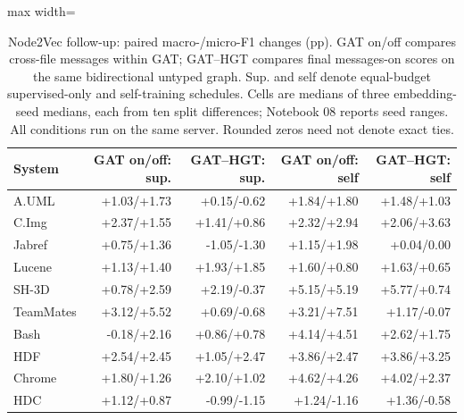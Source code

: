 \begin{table}[t]
\centering\small
\caption{Node2Vec follow-up: paired macro-/micro-F1 changes (pp). GAT on/off compares cross-file messages within GAT; GAT--HGT compares final messages-on scores on the same bidirectional untyped graph. Sup. and self denote equal-budget supervised-only and self-training schedules. Cells are medians of three embedding-seed medians, each from ten split differences; Notebook 08 reports seed ranges. All conditions run on the same server. Rounded zeros need not denote exact ties.\label{tab:gat_controls}}
\begin{adjustbox}{max width=\textwidth}
\begin{tabular}{lrrrr}
\toprule
System & GAT on/off: sup. & GAT--HGT: sup. & GAT on/off: self & GAT--HGT: self \\
\midrule
A.UML & +1.03/+1.73 & +0.15/-0.62 & +1.84/+1.80 & +1.48/+1.03 \\
C.Img & +2.37/+1.55 & +1.41/+0.86 & +2.32/+2.94 & +2.06/+3.63 \\
Jabref & +0.75/+1.36 & -1.05/-1.30 & +1.15/+1.98 & +0.04/0.00 \\
Lucene & +1.13/+1.40 & +1.93/+1.85 & +1.60/+0.80 & +1.63/+0.65 \\
SH-3D & +0.78/+2.59 & +2.19/-0.37 & +5.15/+5.19 & +5.77/+0.74 \\
TeamMates & +3.12/+5.52 & +0.69/-0.68 & +3.21/+7.51 & +1.17/-0.07 \\
Bash & -0.18/+2.16 & +0.86/+0.78 & +4.14/+4.51 & +2.62/+1.75 \\
HDF & +2.54/+2.45 & +1.05/+2.47 & +3.86/+2.47 & +3.86/+3.25 \\
Chrome & +1.80/+1.26 & +2.10/+1.02 & +4.62/+4.26 & +4.02/+2.37 \\
HDC & +1.12/+0.87 & -0.99/-1.15 & +1.24/-1.16 & +1.36/-0.58 \\
\bottomrule
\end{tabular}
\end{adjustbox}
\end{table}
